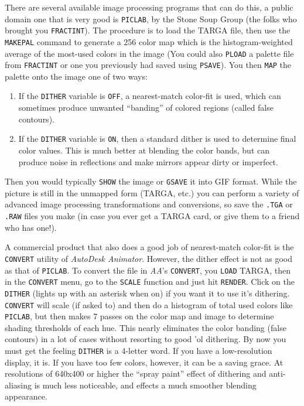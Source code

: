 There are several available image processing programs that can do
this, a public domain one that is very good is
{\tt PICLAB}, by the
Stone Soup Group (the folks who brought you {\tt FRACTINT}).  The
procedure is to load the TARGA file, then use the {\tt MAKEPAL}
command to generate a 256 color map which is the histogram-weighted
average of the most-used colors in the image (You could also
{\tt PLOAD} a palette file from {\tt FRACTINT} or one you previously had
saved using {\tt PSAVE}).  You then {\tt MAP} the palette onto the
image one of two ways:
\begin{enumerate}
\item If the {\tt DITHER} variable is {\tt OFF}, a nearest-match
color-fit is used, which can sometimes produce unwanted ``banding'' of
colored regions (called false contours).
\item If the {\tt DITHER} variable is {\tt ON}, then a standard dither
is used to determine final color values.  This is much better at
blending the color bands, but can produce noise in reflections and
make mirrors appear dirty or imperfect.
\end{enumerate}

Then you would typically {\tt SHOW} the image or {\tt GSAVE} it into
GIF format.  While the picture is still in the unmapped form (TARGA,
etc.) you can perform a variety of advanced image processing
transformations and conversions, so save the {\tt .TGA} or {\tt .RAW}
files you make (in case you ever get a TARGA card, or give them to a
friend who has one!).

A commercial product that also does a good job of nearest-match
color-fit is the {\tt CONVERT} utility of
{\em AutoDesk Animator}.
However, the dither effect is not as good as that of {\tt PICLAB}.  To
convert the file in {\em AA}'s {\tt CONVERT}, you {\tt LOAD} TARGA, then in
the {\tt CONVERT} menu, go to the {\tt SCALE} function and just hit
{\tt RENDER}.  Click on the {\tt DITHER} (lights up with an asterisk
when on) if you want it to use it's dithering.  {\tt CONVERT} will
scale (if asked to) and then do a histogram of total used colors like
{\tt PICLAB}, but then makes 7 passes on the color map and image to
determine shading thresholds of each hue.  This nearly eliminates the
color banding (false contours) in a lot of cases without resorting to
good 'ol dithering.  By now you must get the feeling {\tt DITHER} is a
4-letter word.  If you have a low-resolution display, it is.  If you
have too few colors, however, it can be a saving grace.  At
resolutions of 640x400 or higher the ``spray paint'' effect of
dithering and anti-aliasing is much less noticeable, and effects a
much smoother blending appearance.

